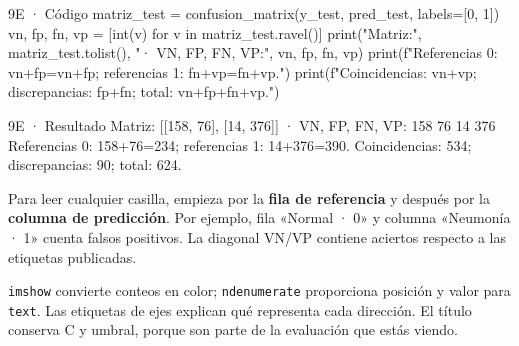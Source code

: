 \begin{Codigo}{9E · Código}
matriz_test = confusion_matrix(y_test, pred_test, labels=[0, 1])
vn, fp, fn, vp = [int(v) for v in matriz_test.ravel()]
print("Matriz:", matriz_test.tolist(), "· VN, FP, FN, VP:", vn, fp, fn, vp)
print(f"Referencias 0: {vn}+{fp}={vn+fp}; referencias 1: {fn}+{vp}={fn+vp}.")
print(f"Coincidencias: {vn+vp}; discrepancias: {fp+fn}; total: {vn+fp+fn+vp}.")
\end{Codigo}

\begin{Salida}{9E · Resultado}
Matriz: [[158, 76], [14, 376]] · VN, FP, FN, VP: 158 76 14 376
Referencias 0: 158+76=234; referencias 1: 14+376=390.
Coincidencias: 534; discrepancias: 90; total: 624.
\end{Salida}

\label{paso-9f}

Para leer cualquier casilla, empieza por la \textbf{fila de referencia} y después por la \textbf{columna de predicción}. Por ejemplo, fila «Normal · 0» y columna «Neumonía · 1» cuenta falsos positivos. La diagonal VN/VP contiene aciertos respecto a las etiquetas publicadas.

\texttt{\small imshow} convierte conteos en color; \texttt{\small ndenumerate} proporciona posición y valor para \texttt{\small text}. Las etiquetas de ejes explican qué representa cada dirección. El título conserva C y umbral, porque son parte de la evaluación que estás viendo.



